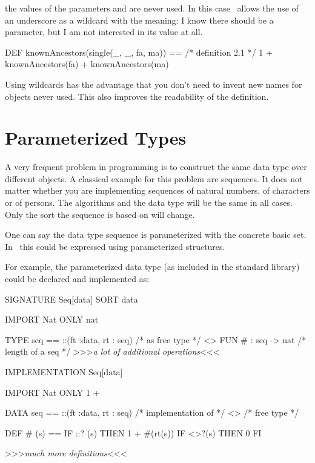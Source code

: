 \noindent the values of the parameters  and  are never used.
In this case \opal\ allows the use of an underscore as a wildcard with the
meaning: I know there should be a parameter, but I am not interested
in its value at all.
\begin{prog}
  DEF knownAncestors(single(_, _, fa, ma)) ==    /* definition 2.1 */
              1 + knownAncestors(fa) + knownAncestors(ma)
\end{prog}
 Using wildcards has the advantage that you don't need to invent new
 names for objects never used. 
This also improves the readability of the definition.

\section{Parameterized Types}
\label{sec:paramType}
\advanced
A very frequent problem in programming is to construct the same data type over
different objects.
A classical example for this problem are  sequences. 
It does not matter whether you are implementing sequences of natural numbers, of
characters or of persons. 
The  algorithms and the data type will be the same in all cases.
Only the sort the sequence is based on will change.

One can say the data type sequence is parameterized with the concrete
basic set.
 In \opal\ this could be expressed using parameterized structures.

For example, the parameterized data type  (as included in the
standard library) could be declared and implemented as:
\begin{prog}
  SIGNATURE Seq[data]
  SORT data
  
  IMPORT Nat ONLY nat

  TYPE seq == ::(ft :data, rt : seq)       /* as free type */
              <>
  FUN # : seq -> nat                     /* length of a seq */
  >>>{\em a lot of additional operations\/}<<<
\end{prog}

\medskip
\begin{prog}
  IMPLEMENTATION Seq[data]

  IMPORT Nat ONLY 1 + 

  DATA seq == ::(ft :data, rt : seq)           /* implementation of */
              <>                               /* free type         */

  DEF # (s) == IF ::? (s) THEN 1 + #(rt(s)) 
               IF <>?(s) THEN 0 FI

  >>>{\em much more definitions\/}<<<

\end{prog}

